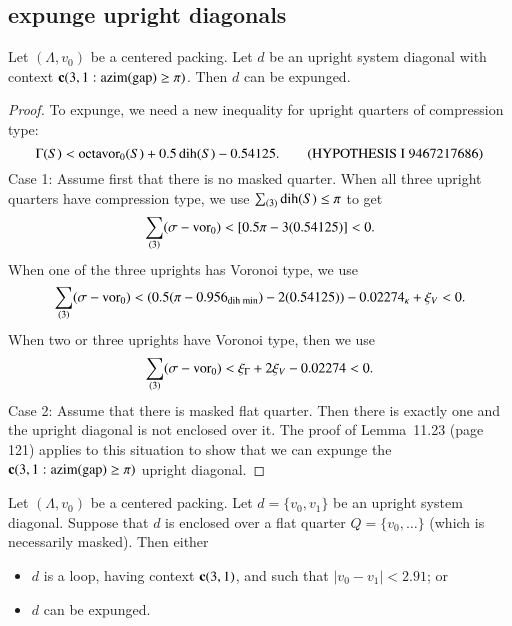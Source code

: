 \subsection{expunge upright diagonals }

\begin{lemma}\label{lemma:ex-xtazimge}
Let $(\Lambda,v_0)$ be a centered packing.  Let $d$ be an upright
system diagonal with context ${\operatorname{\bf c}}{(3,1: {\operatorname{azim}}({\operatorname{gap}}) \ge \pi)}$.  Then $d$ can be expunged.
\end{lemma}


\begin{proof}
To expunge,
we need a new inequality for upright quarters of compression type:
   $$
   \Gamma(S) < {\operatorname{octavor}}_0(S) + 0.5\,{\operatorname{dih}}(S) - 0.54125.
   \qquad \text{(HYPOTHESIS I 9467217686)}
   $$
Case 1: Assume first that there is no masked quarter.
When all three upright quarters have compression type, we use
$\sum_{(3)} {\operatorname{dih}}(S) \le \pi$ to get
   $$\sum_{(3)}(\sigma-{\operatorname{vor}}_0) < 
      [0.5\pi - 3 (0.54125)] < 0.$$
When one of the three uprights has Voronoi type, we use
  $$\sum_{(3)}(\sigma - {\operatorname{vor}}_0 ) <
    (0.5(\pi - 0.956_{\text{dih min}}) - 2(0.54125)) 
    - 0.02274_{\kappa}
    + \xi_V < 0.$$
When two or three uprights have Voronoi type, then we use
   $$\sum_{(3)}(\sigma - {\operatorname{vor}}_0 ) <
   \xi_\Gamma + 2\xi_V -0.02274 < 0.$$
Case 2: Assume that there is masked flat quarter.  Then there
is exactly one and the upright diagonal is not enclosed over it.
The proof of Lemma~11.23 (page 121) applies to this situation
to show that we can expunge the ${\operatorname{\bf c}}{(3,1: {\operatorname{azim}}({\operatorname{gap}}) \ge \pi)}$ upright diagonal.
\end{proof}

\begin{lemma}\label{lemma:ex-x31}
Let $(\Lambda,v_0)$ be a centered packing.  Let $d=\{v_0,v_1\}$ be an upright
system diagonal.  Suppose that $d$ is enclosed over  
a flat quarter $Q=\{v_0,\ldots\}$ (which is necessarily masked).  
Then either
\begin{itemize}
  \item $d$ is a loop, having context ${\operatorname{\bf c}}{(3,1)}$, and such that
    $|v_0-v_1| < 2.91$; or
  \item $d$ can be expunged.
\end{itemize}
\end{lemma}




